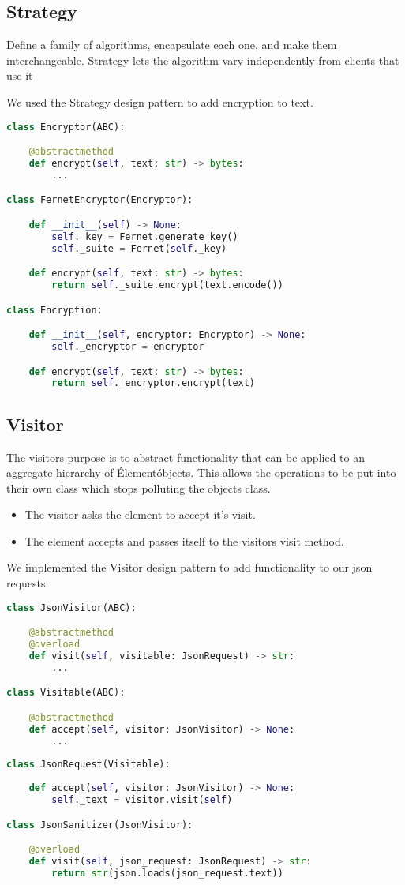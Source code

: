 \subsection{Strategy}
Define a family of algorithms, encapsulate each one, and make them interchangeable. Strategy lets the
algorithm vary independently from clients that use it~\citep{oodesign}

We used the Strategy design pattern to add encryption to text.


\begin{lstlisting}[language=Python]
class Encryptor(ABC):

	@abstractmethod
	def encrypt(self, text: str) -> bytes:
		...

class FernetEncryptor(Encryptor):

	def __init__(self) -> None:
		self._key = Fernet.generate_key()
		self._suite = Fernet(self._key)

	def encrypt(self, text: str) -> bytes:
		return self._suite.encrypt(text.encode())

class Encryption:

	def __init__(self, encryptor: Encryptor) -> None:
		self._encryptor = encryptor

	def encrypt(self, text: str) -> bytes:
		return self._encryptor.encrypt(text)
\end{lstlisting}

\subsection{Visitor}
The visitors purpose is to abstract functionality that can be applied to an aggregate hierarchy of \'Element\' objects. \cite{sourcemaking} This allows the operations to be put into their own class which stops polluting the objects class.
\begin{itemize}
	\item The visitor asks the element to accept it's visit.
	\item The element accepts and passes itself to the visitors visit method.
\end{itemize}

We implemented the Visitor design pattern to add functionality to our json requests.

\begin{lstlisting}[language=Python]
class JsonVisitor(ABC):

	@abstractmethod
	@overload
	def visit(self, visitable: JsonRequest) -> str:
		...

class Visitable(ABC):

	@abstractmethod
	def accept(self, visitor: JsonVisitor) -> None:
		...
	
class JsonRequest(Visitable):
	
	def accept(self, visitor: JsonVisitor) -> None:
		self._text = visitor.visit(self)

class JsonSanitizer(JsonVisitor):

	@overload
	def visit(self, json_request: JsonRequest) -> str:
		return str(json.loads(json_request.text))
\end{lstlisting}

